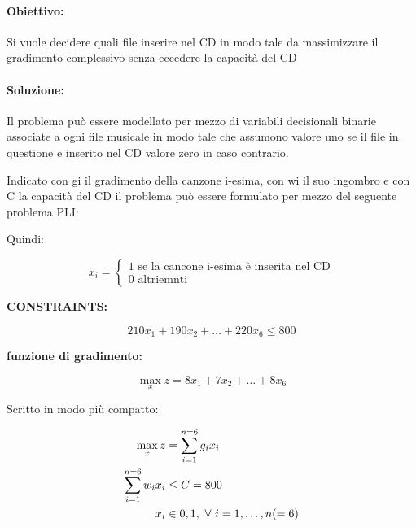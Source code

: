 \documentclass[a4paper, 11pt]{article}
\begin{document}
            \paragraph{Obiettivo: } Si vuole decidere quali file inserire nel CD in modo tale da massimizzare il gradimento complessivo senza eccedere la capacità del CD

            \paragraph{Soluzione: } Il problema può essere modellato per mezzo di variabili decisionali binarie associate a ogni file musicale in modo tale che assumono valore uno se il file in questione e inserito nel CD valore zero in caso contrario.

            Indicato con gi il gradimento della canzone i-esima, con wi il suo ingombro e con C la capacità del CD il problema può essere formulato per mezzo del seguente problema PLI: 

            Quindi:



            \[
                x_i = 
                \begin{cases}
                    1 \text{ se la cancone i-esima è inserita nel CD} \\
                    0 \text{ altriemnti}
                \end{cases}
            \]

            
            \textbf{CONSTRAINTS: }
            
            
            \[
                210x_1+190x_2+\ldots+220x_6 \leq 800
            \]
            


            \textbf{funzione di gradimento: }
            


            \[
                \max_{x} z = 8x_1 + 7x_2+\ldots+8x_6
            \]


            Scritto in modo più compatto:
            
            \begin{align}
                \max_{x} z &= \sum_{i = 1}^{n = 6} g_ix_i \notag \\
                \sum_{i = 1}^{n = 6} w_ix_i &\leq C = 800 \notag \\
                x_i &\in {0,1}, \text{ $\forall$ } i = 1,\ldots, n (= 6 )  \notag
            \end{align}
\end{document}
